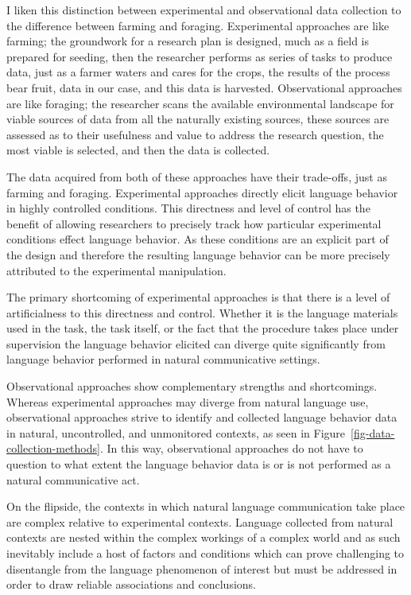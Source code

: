 \documentclass[
  letterpaper,
  DIV=11,
  numbers=noendperiod]{scrreprt}
\theoremstyle{definition}
\theoremstyle{remark}
\begin{document}
I liken this distinction between experimental and observational data
collection to the difference between farming and foraging. Experimental
approaches are like farming; the groundwork for a research plan is
designed, much as a field is prepared for seeding, then the researcher
performs as series of tasks to produce data, just as a farmer waters and
cares for the crops, the results of the process bear fruit, data in our
case, and this data is harvested. Observational approaches are like
foraging; the researcher scans the available environmental landscape for
viable sources of data from all the naturally existing sources, these
sources are assessed as to their usefulness and value to address the
research question, the most viable is selected, and then the data is
collected.

The data acquired from both of these approaches have their trade-offs,
just as farming and foraging. Experimental approaches directly elicit
language behavior in highly controlled conditions. This directness and
level of control has the benefit of allowing researchers to precisely
track how particular experimental conditions effect language behavior.
As these conditions are an explicit part of the design and therefore the
resulting language behavior can be more precisely attributed to the
experimental manipulation.

The primary shortcoming of experimental approaches is that there is a
level of artificialness to this directness and control. Whether it is
the language materials used in the task, the task itself, or the fact
that the procedure takes place under supervision the language behavior
elicited can diverge quite significantly from language behavior
performed in natural communicative settings.

Observational approaches show complementary strengths and shortcomings.
Whereas experimental approaches may diverge from natural language use,
observational approaches strive to identify and collected language
behavior data in natural, uncontrolled, and unmonitored contexts, as
seen in Figure~\ref{fig-data-collection-methods}. In this way,
observational approaches do not have to question to what extent the
language behavior data is or is not performed as a natural communicative
act.

On the flipside, the contexts in which natural language communication
take place are complex relative to experimental contexts. Language
collected from natural contexts are nested within the complex workings
of a complex world and as such inevitably include a host of factors and
conditions which can prove challenging to disentangle from the language
phenomenon of interest but must be addressed in order to draw reliable
associations and conclusions.
\end{document}
